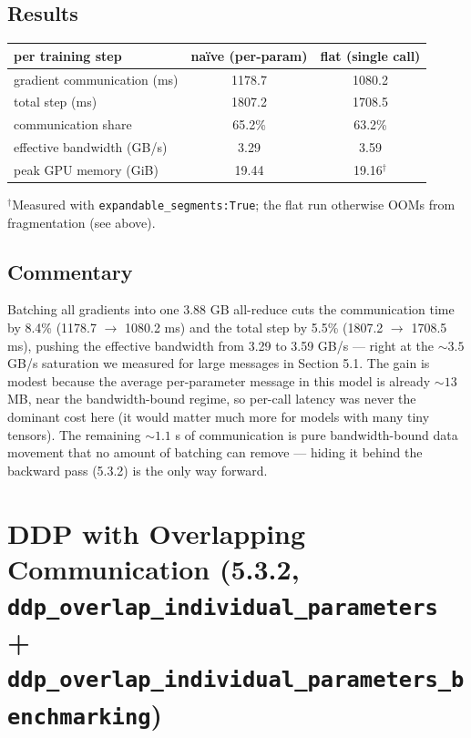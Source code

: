 \documentclass[11pt]{article}
\newcommand{\code}[1]{\texttt{#1}}
\begin{document}
\subsection{Results}

\begin{center}\small
\begin{tabular}{lcc}
\toprule
per training step & na\"ive (per-param) & flat (single call) \\
\midrule
gradient communication (ms) & 1178.7 & 1080.2 \\
total step (ms)             & 1807.2 & 1708.5 \\
communication share         & 65.2\% & 63.2\% \\
effective bandwidth (GB/s)  & 3.29   & 3.59   \\
\midrule
peak GPU memory (GiB)       & 19.44  & 19.16$^{\dagger}$ \\
\bottomrule
\end{tabular}
\end{center}

$^{\dagger}$\footnotesize Measured with \code{expandable\_segments:True}; the flat run otherwise
OOMs from fragmentation (see above).\normalsize

\subsection{Commentary}

Batching all gradients into one 3.88 GB all-reduce cuts the communication time by 8.4\% (1178.7
$\rightarrow$ 1080.2 ms) and the total step by 5.5\% (1807.2 $\rightarrow$ 1708.5 ms), pushing the
effective bandwidth from 3.29 to 3.59 GB/s --- right at the ${\sim}3.5$ GB/s saturation we measured
for large messages in Section 5.1. The gain is modest because the average per-parameter message in
this model is already ${\sim}13$ MB, near the bandwidth-bound regime, so per-call latency was never
the dominant cost here (it would matter much more for models with many tiny tensors). The remaining
${\sim}1.1$ s of communication is pure bandwidth-bound data movement that no amount of batching can
remove --- hiding it behind the backward pass (5.3.2) is the only way forward.

\section{DDP with Overlapping Communication (5.3.2,
\texttt{ddp\_overlap\_individual\_parameters} +
\texttt{ddp\_overlap\_individual\_parameters\_benchmarking})}
\end{document}
